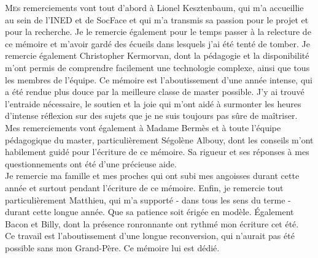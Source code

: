 \documentclass[a4paper,12pt,twoside]{book}
\begin{document}
\lettrine{M}es remerciements vont tout d'abord à Lionel Kesztenbaum, qui m'a accueillie au sein de l'INED et de SocFace et qui m'a transmis sa passion pour le projet et pour la recherche. Je le remercie également pour le temps passer à la relecture de ce mémoire et m'avoir gardé des écueils dans lesquels j'ai été tenté de tomber. Je remercie également Christopher Kermorvan, dont la pédagogie et la disponibilité m'ont permis de comprendre facilement une technologie complexe, ainsi que tous les membres de l'équipe. Ce mémoire est l'aboutissement d'une année intense, qui a été rendue plus douce par la meilleure classe de master possible. J'y ai trouvé l'entraide nécessaire, le soutien et la joie qui m'ont aidé à surmonter les heures d'intense réflexion sur des sujets que je ne suis toujours pas sûre de maîtriser. Mes remerciements vont également à Madame Bermès et à toute l'équipe pédagogique du master, particulièrement Ségolène Albouy, dont les conseils m'ont habilement guidé pour l'écriture de ce mémoire. Sa rigueur et ses réponses à mes questionnements ont été d'une précieuse aide. \\
Je remercie ma famille et mes proches qui ont subi mes angoisses durant cette année et surtout pendant l'écriture de ce mémoire. 
Enfin, je remercie tout particulièrement Matthieu, qui m'a supporté - dans tous les sens du terme - durant cette longue année. Que sa patience soit érigée en modèle. Également Bacon et Billy, dont la présence ronronnante ont rythmé mon écriture cet été. \\

Ce travail est l'aboutissement d'une longue reconversion, qui n'aurait pas été possible sans mon Grand-Père. Ce mémoire lui est dédié. 

	\newpage{\pagestyle{empty}\cleardoublepage}

\begingroup
    \let\cleardoublepage\clearpage
    \printbibliography[keyword={Collab}, title={Collaboration et Interdisciplinarité}]
    \printbibliography[keyword={DB - BD}, title={Base de Données et Big Data}]
    \printbibliography[keyword={Demo}, title={Démographie}]
    \printbibliography[keyword={PPP}, title={Recherche Partenariale}]
    \printbibliography[keyword={DL}, title={Deep Learning}]
\endgroup

\newpage{\pagestyle{empty}\cleardoublepage}%
	
\end{document}
